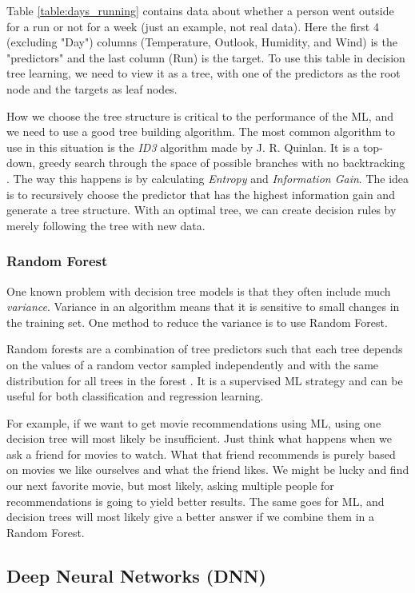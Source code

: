 Table \ref{table:days_running} contains data about whether a person went outside for a run or not for a week (just an example, not real data). 
Here the first 4 (excluding "Day") columns (Temperature, Outlook, Humidity, and Wind) is the "predictors" and the last column (Run) is the target. 
To use this table in decision tree learning, we need to view it as a tree, with one of the predictors as the root node and the targets as leaf nodes. 

How we choose the tree structure is critical to the performance of the ML, and we need to use a good tree building algorithm. 
The most common algorithm to use in this situation is the \textit{ID3} algorithm made by J. R. Quinlan. It is a top-down, greedy search through the space 
of possible branches with no backtracking \cite{decision_tree}. The way this happens is by calculating \textit{Entropy} and \textit{Information Gain}. 
The idea is to recursively choose the predictor that has the highest information gain and generate a tree structure. With an optimal tree, 
we can create decision rules by merely following the tree with new data.

\subsubsection{Random Forest}
One known problem with decision tree models is that they often include much \textit{variance}. Variance in an algorithm means that it is sensitive to small 
changes in the training set. One method to reduce the variance is to use Random Forest. 

Random forests are a combination of tree predictors such that each tree depends on the values of a
random vector sampled independently and with the same distribution for all trees in the forest \cite{random_forest}. 
It is a supervised ML strategy and can be useful for both classification and regression learning.

For example, if we want to get movie recommendations using ML, using one decision tree will most likely be insufficient. 
Just think what happens when we ask a friend for movies to watch. What that friend recommends is purely based on movies we like ourselves and what the friend likes. 
We might be lucky and find our next favorite movie, but most likely, asking multiple people for recommendations is going to yield better results. 
The same goes for ML, and decision trees will most likely give a better answer if we combine them in a Random Forest.

\subsection{Deep Neural Networks (DNN)}

